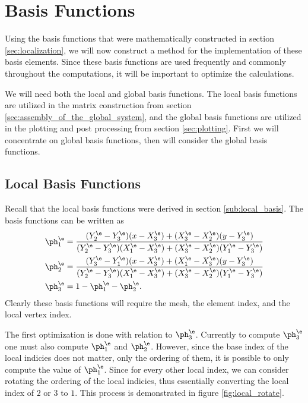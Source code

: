 \documentclass[../fem.tex]{subfile}
\begin{document}
\section{Basis Functions}%
\label{sec:basis_functions}

Using the basis functions that were mathematically constructed in section
\ref{sec:localization}, we will now construct a method for the implementation
of these basis elements. Since these basis functions are used frequently and
commonly throughout the computations, it will be important to optimize the
calculations.

We will need both the local and global basis functions. The local basis
functions are utilized in the matrix construction from section
\ref{sec:assembly_of_the_global_system}, and the global basis functions are
utilized in the plotting and post processing from section \ref{sec:plotting}.
First we will concentrate on global basis functions, then will consider the
global basis functions.

\subsection{Local Basis Functions}%
\label{sub:local_basis_functions}

Recall that the local basis functions were derived in section
\ref{sub:local_basis}. The basis functions can be written as
\begin{align*}
  \ph^\e_1&=\frac{(Y^\e_2-Y^\e_3)(x-X^\e_3)+(X^\e_3-X^\e_2)(y-Y^\e_3)}{(Y^\e_2-Y^\e_3)(X^\e_1-X^\e_3)+(X^\e_3-X^\e_2)(Y^\e_1-Y^\e_3)}\\
  \ph^\e_2&=\frac{(Y^\e_3-Y^\e_1)(x-X^\e_3)+(X^\e_1-X^\e_3)(y-Y^\e_3)}{(Y^\e_2-Y^\e_3)(X^\e_1-X^\e_3)+(X^\e_3-X^\e_2)(Y^\e_1-Y^\e_3)}\\
  \ph^\e_3&=1-\ph^\e_1-\ph^\e_2.
\end{align*}
Clearly these basis functions will require the mesh, the element index, and the
local vertex index.

The first optimization is done with relation to $\ph^\e_3$.  Currently to
compute $\ph^\e_3$ one must also compute $\ph^\e_1$ and $\ph^\e_2$. However,
since the base index of the local indicies does not matter, only the ordering
of them, it is possible to only compute the value of $\ph^\e_1$. Since for
every other local index, we can consider rotating the ordering of the local
indicies, thus essentially converting the local index of $2$ or $3$ to $1$.
This process is demonstrated in figure \ref{fig:local_rotate}.
\end{document}
